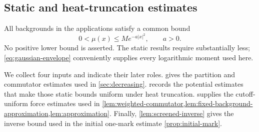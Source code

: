 \documentclass[11pt,reqno]{amsart}
\numberwithin{equation}{section}
\theoremstyle{plain}
\theoremstyle{remark}
\begin{document}
\subsection{Static and heat-truncation estimates}
All backgrounds in the applications satisfy a common bound
\begin{equation}\label{eq:gaussian-envelope}
 0<\mu(x)\le M e^{-a|x|^2},\qquad a>0.
\end{equation}
No positive lower bound is asserted. The static results require substantially less; \eqref{eq:gaussian-envelope} conveniently supplies every logarithmic moment used here.

We collect four inputs and indicate their later roles.  gives the partition and commutator estimates used in \cref{sec:decreasing}.  records the potential estimates that make those static bounds uniform under heat truncation.  supplies the cutoff-uniform force estimates used in \cref{lem:weighted-commutator,lem:fixed-background-approximation,lem:approximation}. Finally, \cref{lem:screened-inverse} gives the inverse bound used in the initial one-mark estimate \cref{prop:initial-mark}.
\end{document}
